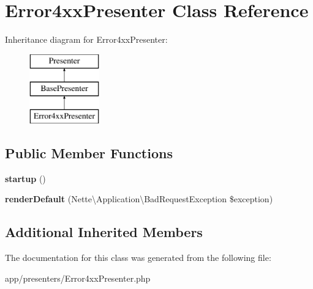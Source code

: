 \section{Error4xx\+Presenter Class Reference}
\label{class_app_1_1_presenters_1_1_error4xx_presenter}
Inheritance diagram for Error4xx\+Presenter\+:\begin{figure}[H]
\begin{center}
\leavevmode
\includegraphics[height=3.000000cm]{class_app_1_1_presenters_1_1_error4xx_presenter}
\end{center}
\end{figure}
\subsection*{Public Member Functions}
\begin{DoxyCompactItemize}
\item 
\mbox{\label{class_app_1_1_presenters_1_1_error4xx_presenter_aca47505b8732177f52bb2d647eb2741c}} 
{\bfseries startup} ()
\item 
\mbox{\label{class_app_1_1_presenters_1_1_error4xx_presenter_a57df1339c0adc6203f2e02bcddc435aa}} 
{\bfseries render\+Default} (Nette\textbackslash{}\+Application\textbackslash{}\+Bad\+Request\+Exception \$exception)
\end{DoxyCompactItemize}
\subsection*{Additional Inherited Members}


The documentation for this class was generated from the following file\+:\begin{DoxyCompactItemize}
\item 
app/presenters/Error4xx\+Presenter.\+php\end{DoxyCompactItemize}
